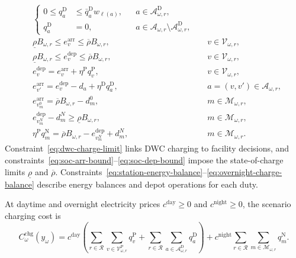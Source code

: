\begin{align}
    & \left\{\begin{aligned}
        0 \leq q_a^{\mathrm D}
        &\leq \bar q_a^{\mathrm D}w_{\ell(a)},
        && a\in\mathcal A^{\mathrm D}_{\omega,r}, \\
        q_a^{\mathrm D} &= 0,
        && a\in\mathcal A_{\omega,r}\setminus\mathcal A^{\mathrm D}_{\omega,r},
    \end{aligned}\right.
    \label{eq:dwc-charge-limit} \\
    & \underline{\rho} B_{\omega,r}
    \leq
    e^{\mathrm{arr}}_v
    \leq
    \overline{\rho} B_{\omega,r},
    && v \in \mathcal{V}_{\omega,r},
    \label{eq:soc-arr-bound} \\
    & \underline{\rho} B_{\omega,r}
    \leq
    e^{\mathrm{dep}}_v
    \leq
    \overline{\rho} B_{\omega,r},
    && v \in \mathcal{V}_{\omega,r},
    \label{eq:soc-dep-bound} \\
    & e^{\mathrm{dep}}_v
    =
    e^{\mathrm{arr}}_v
    +
    \eta^{\mathrm{P}}
    q_v^{\mathrm{P}},
    && v \in \mathcal{V}_{\omega,r},
    \label{eq:station-energy-balance} \\
    & e^{\mathrm{arr}}_{v'}
    =
    e^{\mathrm{dep}}_v
    -
    d_a
    +
    \eta^{\mathrm{D}}
    q_a^{\mathrm{D}},
    && a=(v,v') \in \mathcal{A}_{\omega,r},
    \label{eq:link-energy-balance} \\
    & e^{\mathrm{arr}}_{v_m^{0}}
    =
    \overline{\rho} B_{\omega,r}
    -
    d_m^{0},
    && m \in \mathcal{M}_{\omega,r},
    \label{eq:initial-boundary-energy} \\
    & e^{\mathrm{dep}}_{v_m^{N}}
    -
    d_m^{N}
    \geq
    \underline{\rho} B_{\omega,r},
    && m \in \mathcal{M}_{\omega,r},
    \label{eq:return-boundary-energy} \\
    & \eta^{\mathrm{P}} q_m^{\mathrm{N}}
    =
    \overline{\rho} B_{\omega,r}
    -
    e^{\mathrm{dep}}_{v_m^{N}}
    +
    d_m^{N},
    && m \in \mathcal{M}_{\omega,r}.
    \label{eq:overnight-charge-balance}
\end{align}
\endgroup
Constraint~\eqref{eq:dwc-charge-limit} links DWC charging to facility decisions, and constraints~\eqref{eq:soc-arr-bound}--\eqref{eq:soc-dep-bound} impose the state-of-charge limits $\underline\rho$ and $\overline\rho$.
Constraints~\eqref{eq:station-energy-balance}--\eqref{eq:overnight-charge-balance} describe energy balances and depot operations for each duty.

At daytime and overnight electricity prices $c^{\mathrm{day}}\geq 0$ and $c^{\mathrm{night}}\geq 0$, the scenario charging cost is
\[
    C^{\mathrm{chg}}_\omega(y_\omega)
    =
    c^{\mathrm{day}}
    \left(
    \sum_{r \in \mathcal{R}}
    \sum_{v \in \mathcal{V}^{\mathrm{P}}_{\omega,r}} q_v^{\mathrm{P}}
    +
    \sum_{r \in \mathcal{R}}
    \sum_{a \in \mathcal{A}^{\mathrm D}_{\omega,r}} q_a^{\mathrm{D}}
    \right)
    +
    c^{\mathrm{night}}
    \sum_{r \in \mathcal{R}}
    \sum_{m \in \mathcal{M}_{\omega,r}}
    q_m^{\mathrm{N}}.
\]
